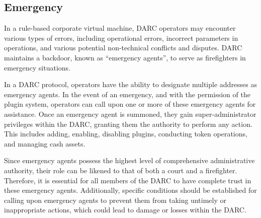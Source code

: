 \documentclass[main.tex]{subfiles}
\begin{document}
\subsection{Emergency}

In a rule-based corporate virtual machine, DARC operators may encounter various types of errors, including operational errors, incorrect parameters in operations, and various potential non-technical conflicts and disputes. DARC maintains a backdoor, known as ``emergency agents'', to serve as firefighters in emergency situations.

In a DARC protocol, operators have the ability to designate multiple addresses as emergency agents. In the event of an emergency, and with the permission of the plugin system, operators can call upon one or more of these emergency agents for assistance. Once an emergency agent is summoned, they gain super-administrator privileges within the DARC, granting them the authority to perform any action. This includes adding, enabling, disabling plugins, conducting token operations, and managing cash assets.

Since emergency agents possess the highest level of comprehensive administrative authority, their role can be likened to that of both a court and a firefighter. Therefore, it is essential for all members of the DARC to have complete trust in these emergency agents. Additionally, specific conditions should be established for calling upon emergency agents to prevent them from taking untimely or inappropriate actions, which could lead to damage or losses within the DARC.
\end{document}
